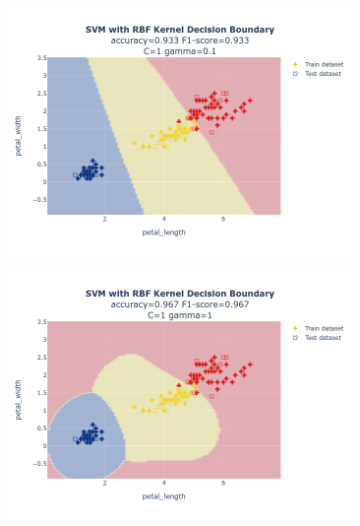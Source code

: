 \documentclass{article}
\begin{document}
\begin{figure}
\begin{subfigure}{0.3\textwidth}
        \includegraphics[scale=.13]{images/implementation/q1/rbf_kernel/petal_length_petal_width_1_0.1.png}
    \end{subfigure}
    \hfill
    \begin{subfigure}{0.3\textwidth}
        \centering
        \includegraphics[scale=.13]{images/implementation/q1/rbf_kernel/petal_length_petal_width_1_1.png}
    \end{subfigure}
    \hfill
    \begin{subfigure}{0.3\textwidth}
        \centering

\end{subfigure}
\end{figure}
\end{document}
